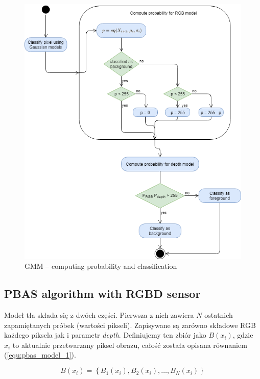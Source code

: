\documentclass[b5paper,10pt,twoside]{article}
\begin{document}
{\begin{figure}[!t]
	\begin{center}
		\includegraphics[scale=0.50]{img/gmm_alg.png}
		\caption{GMM -- computing probability and classification}
		\label{fig:gmm_alg}
	\end{center}
\end{figure}

\subsection{PBAS algorithm with RGBD sensor}
\label{subsec:pbas_rgbd}

Modeł tła składa się z dwóch części. Pierwsza z nich zawiera $N$ ostatnich zapamiętanych próbek (wartości pikseli). Zapisywane są zarówno składowe RGB każdego piksela jak i parametr \textit{depth}. Definiujemy ten zbiór jako $B(x_i)$, gdzie $x_i$ to aktualnie przetwarzany piksel obrazu, całość została opisana równaniem (\ref{equ:pbas_model_1}).

	\begin{equation}
		B(x_i)= \left\{ B_1(x_i), B_2(x_i), \dotsc, B_N(x_i) \right\}
	\label{equ:pbas_model_1}	
	\end{equation}

}
\end{document}
